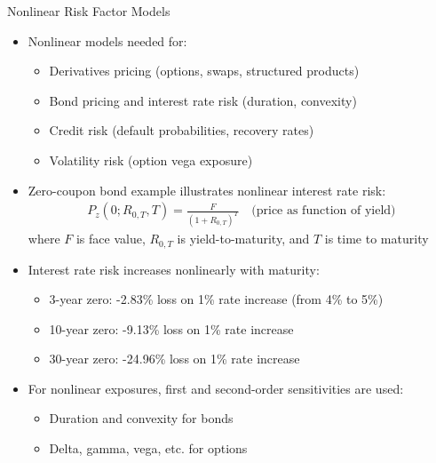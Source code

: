 \documentclass[10pt]{beamer}
\begin{document}
\begin{frame}{Nonlinear Risk Factor Models}
  \begin{itemize}[<+->]
    \item Nonlinear models needed for:
      \begin{itemize}
        \item Derivatives pricing (options, swaps, structured products)
        \item Bond pricing and interest rate risk (duration, convexity)
        \item Credit risk (default probabilities, recovery rates)
        \item Volatility risk (option vega exposure)
      \end{itemize}
    \item Zero-coupon bond example illustrates nonlinear interest rate risk:
      \begin{align*}
        P_z(0; R_{0,T}, T) = \tfrac{F}{(1 + R_{0,T})^T} \quad \text{(price as function of yield)}
      \end{align*}
      where $F$ is face value, $R_{0,T}$ is yield-to-maturity, and $T$ is time to maturity
      
    \item Interest rate risk increases nonlinearly with maturity:
      \begin{itemize}
        \item 3-year zero: -2.83\% loss on 1\% rate increase (from 4\% to 5\%)
        \item 10-year zero: -9.13\% loss on 1\% rate increase
        \item 30-year zero: -24.96\% loss on 1\% rate increase
      \end{itemize}
    
    \item For nonlinear exposures, first and second-order sensitivities are used:
      \begin{itemize}
        \item Duration and convexity for bonds
        \item Delta, gamma, vega, etc. for options
      \end{itemize}
  \end{itemize}
\end{frame}
\end{document}
